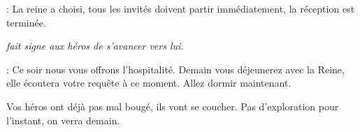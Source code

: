 \begin{quotebox}
\noindent\textbf{}: La reine a choisi, tous les invités doivent partir immédiatement, la réception est terminée.

\emph{ fait signe aux héros de s’avancer vers lui.}

\noindent\textbf{}: Ce soir nous vous offrons l’hospitalité. Demain vous déjeunerez avec la Reine, elle écoutera votre requête à ce moment. Allez dormir maintenant.
\end{quotebox}

Vos héros ont déjà pas mal bougé, ils vont se coucher. Pas d’exploration pour l’instant, on verra demain.
